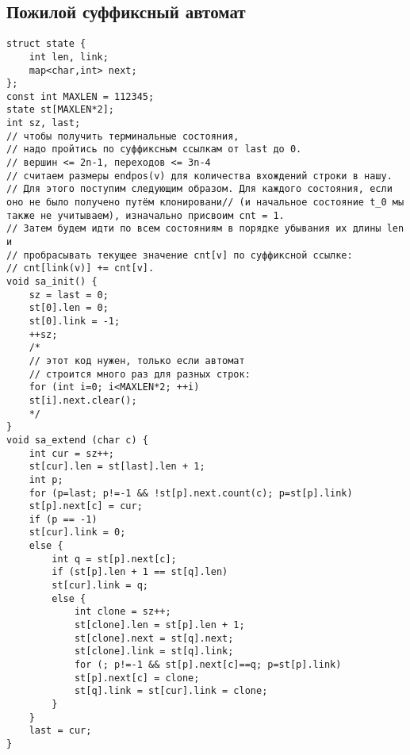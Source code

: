 \documentclass[14pt,fleqn]{article}
\begin{document}
\subsection{Пожилой суффиксный автомат}
\begin{Verbatim}[tabsize=4]
struct state {
	int len, link;
	map<char,int> next;
};
const int MAXLEN = 112345;
state st[MAXLEN*2];
int sz, last;
// чтобы получить терминальные состояния,
// надо пройтись по суффиксным ссылкам от last до 0.
// вершин <= 2n-1, переходов <= 3n-4
// считаем размеры endpos(v) для количества вхождений строки в нашу.
// Для этого поступим следующим образом. Для каждого состояния, если оно не было получено путём клонировани// (и начальное состояние t_0 мы также не учитываем), изначально присвоим cnt = 1.
// Затем будем идти по всем состояниям в порядке убывания их длины len и
// пробрасывать текущее значение cnt[v] по суффиксной ссылке:
// cnt[link(v)] += cnt[v].
void sa_init() {
	sz = last = 0;
	st[0].len = 0;
	st[0].link = -1;
	++sz;
	/*
	// этот код нужен, только если автомат
	// строится много раз для разных строк:
	for (int i=0; i<MAXLEN*2; ++i)
	st[i].next.clear();
	*/
}
void sa_extend (char c) {
	int cur = sz++;
	st[cur].len = st[last].len + 1;
	int p;
	for (p=last; p!=-1 && !st[p].next.count(c); p=st[p].link)
	st[p].next[c] = cur;
	if (p == -1)
	st[cur].link = 0;
	else {
		int q = st[p].next[c];
		if (st[p].len + 1 == st[q].len)
		st[cur].link = q;
		else {
			int clone = sz++;
			st[clone].len = st[p].len + 1;
			st[clone].next = st[q].next;
			st[clone].link = st[q].link;
			for (; p!=-1 && st[p].next[c]==q; p=st[p].link)
			st[p].next[c] = clone;
			st[q].link = st[cur].link = clone;
		}
	}
	last = cur;
}
\end{Verbatim}
\end{document}
